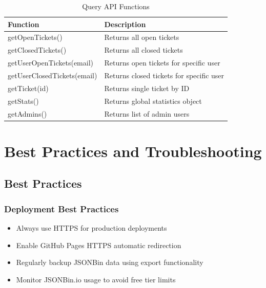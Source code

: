 \documentclass[12pt,a4paper]{report}
\begin{document}
\begin{table}[H]
    \centering
    \caption[Query API Functions]{Query API Functions}
    \begin{tabular}{|l|p{8cm}|}
        \hline
        \textbf{Function} & \textbf{Description} \\
        \hline
        getOpenTickets() & Returns all open tickets \\
        \hline
        getClosedTickets() & Returns all closed tickets \\
        \hline
        getUserOpenTickets(email) & Returns open tickets for specific user \\
        \hline
        getUserClosedTickets(email) & Returns closed tickets for specific user \\
        \hline
        getTicket(id) & Returns single ticket by ID \\
        \hline
        getStats() & Returns global statistics object \\
        \hline
        getAdmins() & Returns list of admin users \\
        \hline
    \end{tabular}
    \label{tab:query-functions}
\end{table}

\cleardoublepage

\chapter{Best Practices and Troubleshooting}
\thispagestyle{fancy}
\label{chap:troubleshooting}

\section{Best Practices}
\label{sec:best-practices}

\subsection{Deployment Best Practices}
\begin{itemize}
    \item Always use HTTPS for production deployments
    \item Enable GitHub Pages HTTPS automatic redirection
    \item Regularly backup JSONBin data using export functionality
    \item Monitor JSONBin.io usage to avoid free tier limits
\end{itemize}
\end{document}
